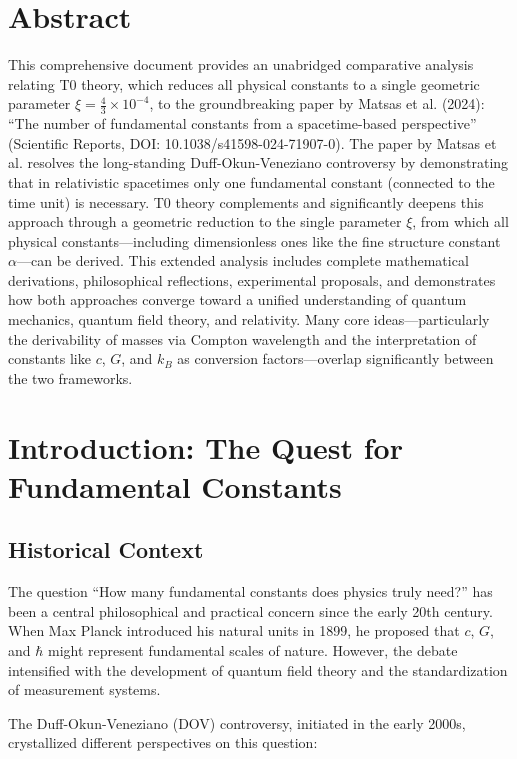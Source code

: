 \section*{Abstract}
		This comprehensive document provides an unabridged comparative analysis relating T0 theory, which reduces all physical constants to a single geometric parameter $\xi = \frac{4}{3} \times 10^{-4}$, to the groundbreaking paper by Matsas et al. (2024): ``The number of fundamental constants from a spacetime-based perspective'' (Scientific Reports, DOI: 10.1038/s41598-024-71907-0). The paper by Matsas et al. resolves the long-standing Duff-Okun-Veneziano controversy by demonstrating that in relativistic spacetimes only one fundamental constant (connected to the time unit) is necessary. T0 theory complements and significantly deepens this approach through a geometric reduction to the single parameter $\xi$, from which all physical constants—including dimensionless ones like the fine structure constant $\alpha$—can be derived. This extended analysis includes complete mathematical derivations, philosophical reflections, experimental proposals, and demonstrates how both approaches converge toward a unified understanding of quantum mechanics, quantum field theory, and relativity. Many core ideas—particularly the derivability of masses via Compton wavelength and the interpretation of constants like $c$, $G$, and $k_B$ as conversion factors—overlap significantly between the two frameworks.

	
	
	
	
	\section{Introduction: The Quest for Fundamental Constants}
	
	\subsection{Historical Context}
	
	The question ``How many fundamental constants does physics truly need?'' has been a central philosophical and practical concern since the early 20th century. When Max Planck introduced his natural units in 1899, he proposed that $c$, $G$, and $\hbar$ might represent fundamental scales of nature. However, the debate intensified with the development of quantum field theory and the standardization of measurement systems.
	
	The Duff-Okun-Veneziano (DOV) controversy, initiated in the early 2000s, crystallized different perspectives on this question:
	
